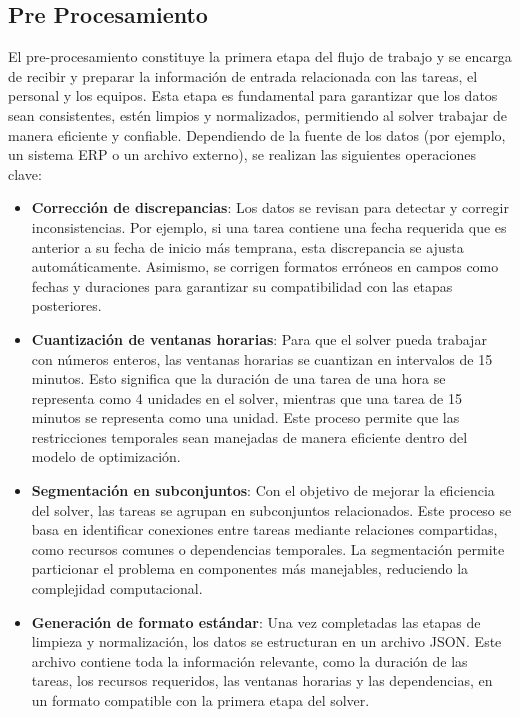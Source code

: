 \documentclass{article}
\begin{document}
\subsection{Pre Procesamiento}


El pre-procesamiento constituye la primera etapa del flujo de trabajo y se encarga de recibir y preparar la información de entrada relacionada con las tareas, el personal y los equipos. Esta etapa es fundamental para garantizar que los datos sean consistentes, estén limpios y normalizados, permitiendo al solver trabajar de manera eficiente y confiable. Dependiendo de la fuente de los datos (por ejemplo, un sistema ERP o un archivo externo), se realizan las siguientes operaciones clave:

\begin{itemize}
    \item \textbf{Corrección de discrepancias}: Los datos se revisan para detectar y corregir inconsistencias. Por ejemplo, si una tarea contiene una fecha requerida que es anterior a su fecha de inicio más temprana, esta discrepancia se ajusta automáticamente. Asimismo, se corrigen formatos erróneos en campos como fechas y duraciones para garantizar su compatibilidad con las etapas posteriores.

    \item \textbf{Cuantización de ventanas horarias}: Para que el solver pueda trabajar con números enteros, las ventanas horarias se cuantizan en intervalos de 15 minutos. Esto significa que la duración de una tarea de una hora se representa como 4 unidades en el solver, mientras que una tarea de 15 minutos se representa como una unidad. Este proceso permite que las restricciones temporales sean manejadas de manera eficiente dentro del modelo de optimización.

    \item \textbf{Segmentación en subconjuntos}: Con el objetivo de mejorar la eficiencia del solver, las tareas se agrupan en subconjuntos relacionados. Este proceso se basa en identificar conexiones entre tareas mediante relaciones compartidas, como recursos comunes o dependencias temporales. La segmentación permite particionar el problema en componentes más manejables, reduciendo la complejidad computacional.

    \item \textbf{Generación de formato estándar}: Una vez completadas las etapas de limpieza y normalización, los datos se estructuran en un archivo JSON. Este archivo contiene toda la información relevante, como la duración de las tareas, los recursos requeridos, las ventanas horarias y las dependencias, en un formato compatible con la primera etapa del solver.
\end{itemize}
\end{document}
